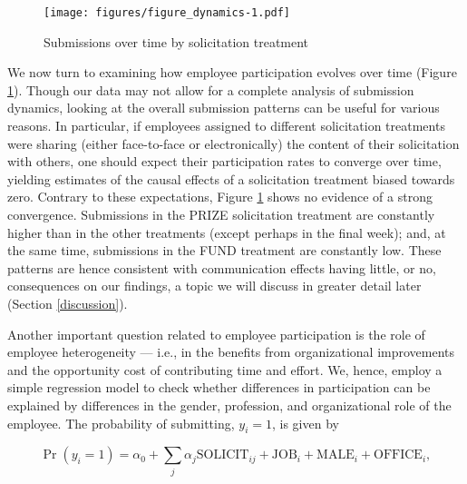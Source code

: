 \documentclass[12pt, titlepage]{article}
\begin{document}
\begin{figure}
\caption{Submissions over time by solicitation treatment}
\label{figure_dynamics}\centering
\texttt{[image: figures/figure\_dynamics-1.pdf]}
\end{figure}

We now turn to examining how employee participation evolves over time
(Figure \ref{figure_dynamics}). Though our data may not allow for a
complete analysis of submission dynamics, looking at the overall
submission patterns can be useful for various reasons. In particular, if
employees assigned to different solicitation treatments were sharing
(either face-to-face or electronically) the content of their
solicitation with others, one should expect their participation rates to
converge over time, yielding estimates of the causal effects of a
solicitation treatment biased towards zero. Contrary to these
expectations, Figure \ref{figure_dynamics} shows no evidence of a strong
convergence. Submissions in the PRIZE solicitation treatment are
constantly higher than in the other treatments (except perhaps in the
final week); and, at the same time, submissions in the FUND treatment
are constantly low. These patterns are hence consistent with
communication effects having little, or no, consequences on our
findings, a topic we will discuss in greater detail later (Section
\ref{discussion}).

Another important question related to employee participation is the role
of employee heterogeneity --- i.e., in the benefits from organizational
improvements and the opportunity cost of contributing time and effort.
We, hence, employ a simple regression model to check whether differences
in participation can be explained by differences in the gender,
profession, and organizational role of the employee. The probability of
submitting, \(y_i=1\), is given by

\begin{equation} 
  \label{eq: submit}
    \Pr(y_i=1) = \alpha_0 + \sum_{j} \alpha_{j} \text{SOLICIT}_{ij}
                                    + \text{JOB}_{i} 
                                    + \text{MALE}_{i} 
                                    + \text{OFFICE}_{i}, 
\end{equation}
\end{document}
